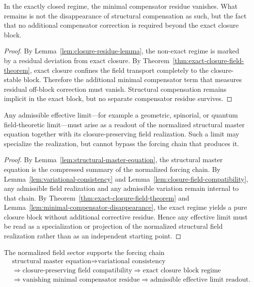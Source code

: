 \begin{lemma}
\label{lem:minimal-compensator-disappearance}
In the exactly closed regime, the minimal compensator residue vanishes. What
remains is not the disappearance of structural compensation as such, but the
fact that no additional compensator correction is required beyond the exact
closure block.
\end{lemma}

\begin{proof}
By Lemma~\ref{lem:closure-residue-lemma}, the non-exact regime is marked
by a residual deviation from exact closure. By
Theorem~\ref{thm:exact-closure-field-theorem}, exact closure confines the field
transport completely to the closure-stable block. Therefore the additional
minimal compensator term that measures residual off-block correction must
vanish. Structural compensation remains implicit in the exact block, but no
separate compensator residue survives.
\end{proof}

\begin{theorem}
\label{thm:effective-limit-theorem}
Any admissible effective limit---for example a geometric, spinorial, or quantum
field-theoretic limit---must arise as a readout of the normalized structural
master equation together with its closure-preserving field realization. Such a
limit may specialize the realization, but cannot bypass the forcing chain that
produces it.
\end{theorem}

\begin{proof}
By Lemma~\ref{lem:structural-master-equation}, the structural master equation is
the compressed summary of the normalized forcing chain. By
Lemma~\ref{lem:variational-consistency} and Lemma~\ref{lem:closure-field-compatibility},
any admissible field realization and any admissible variation remain internal to
that chain. By Theorem~\ref{thm:exact-closure-field-theorem} and
Lemma~\ref{lem:minimal-compensator-disappearance}, the exact regime yields a
pure closure block without additional corrective residue. Hence any effective
limit must be read as a specialization or projection of the normalized
structural field realization rather than as an independent starting point.
\end{proof}

\begin{corollary}
\label{cor:first-field-forcing-chain}
The normalized field sector supports the forcing chain
\[
\begin{aligned}
&\text{structural master equation} \Longrightarrow \text{variational consistency}\\
&\Longrightarrow \text{closure-preserving field compatibility} \Longrightarrow \text{exact closure block regime}\\
&\Longrightarrow \text{vanishing minimal compensator residue} \Longrightarrow \text{admissible effective limit readout}.
\end{aligned}
\]
\end{corollary}

